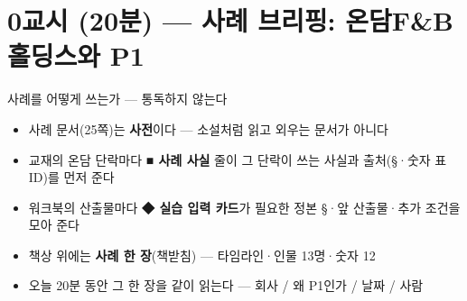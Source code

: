 \section{0교시 (20분) — 사례 브리핑: 온담F\&B홀딩스와 P1}
\begin{frame}{사례를 어떻게 쓰는가 — 통독하지 않는다}
\begin{itemize}
\item 사례 문서(25쪽)는 \textbf{사전}이다 — 소설처럼 읽고 외우는 문서가 아니다
\item 교재의 온담 단락마다 \textbf{■ 사례 사실} 줄이 그 단락이 쓰는 사실과 출처(§·숫자 표 ID)를 먼저 준다
\item 워크북의 산출물마다 \textbf{◆ 실습 입력 카드}가 필요한 정본 §·앞 산출물·추가 조건을 모아 준다
\item 책상 위에는 \textbf{사례 한 장}(책받침) — 타임라인·인물 13명·숫자 12
\item 오늘 20분 동안 그 한 장을 같이 읽는다 — 회사 / 왜 P1인가 / 날짜 / 사람
\end{itemize}
\end{frame}

